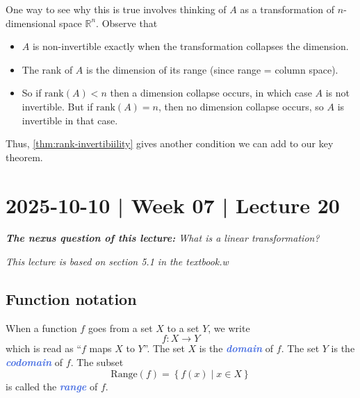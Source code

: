 \documentclass[10pt]{article}
\newcommand{\demph}[1]{\textcolor{RoyalBlue}{\textbf{\slshape #1}}} %
\theoremstyle{definition}
\newcommand{\R}{\mathbb{R}}           %
\begin{document}
One way to see why this is true involves thinking of $A$ as a transformation
of $n$-dimensional space $\R^{n}$. Observe that
\begin{itemize}
  \item $A$ is non-invertible exactly when the transformation collapses the dimension.
  \item The rank of $A$ is the dimension of its range (since range = 
  column space).
  \item So if $\text{rank}(A)<n$ then a dimension collapse occurs, in which
  case $A$ is not invertible. But if $\text{rank}(A)=n$, then no dimension
  collapse occurs, so $A$ is invertible in that case.
\end{itemize}


Thus, \cref{thm:rank-invertibiility} gives another condition we can add to our
key theorem.

\newpage
\section{2025-10-10 | Week 07 | Lecture 20}

\begin{center}
  \begin{tcolorbox}[width=0.9\textwidth, colback=white, colframe=black]
    \textit{\textbf{The nexus question of this lecture:} What is a linear transformation?}
  \end{tcolorbox}
\end{center}

\textit{This lecture is based on section 5.1 in the textbook.w}

\subsection{Function notation}

When a function $f$ goes from a set $X$ to a set $Y$, we write
\begin{equation*}
  f:X \to Y
\end{equation*}
which is read as ``$f$ maps $X$ to $Y$''. The set $X$ is the \demph{domain} of
$f$. The set $Y$ is the \demph{codomain} of $f$. The subset
\begin{equation*}
  \mathrm{Range}(f) = \left\{f(x)\mid x\in X\right\} 
\end{equation*}
is called the \demph{range} of $f$.
\end{document}
